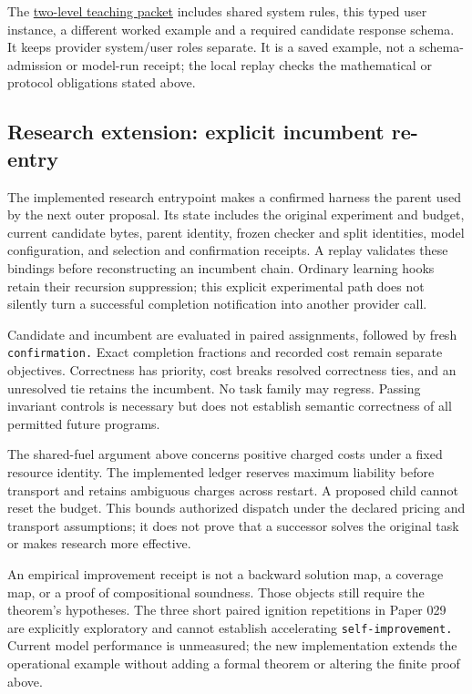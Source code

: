 \documentclass[
  11pt,
]{article}
\begin{document}
The \href{prompts/example.yaml}{two-level teaching packet} includes
shared system rules, this typed user instance, a different worked
example and a required candidate response schema. It keeps provider
system/user roles separate. It is a saved example, not a
schema-admission or model-run receipt; the local replay checks the
mathematical or protocol obligations stated above.

\subsection{Research extension: explicit incumbent
re-entry}\label{research-extension-explicit-incumbent-re-entry}

The implemented research entrypoint makes a confirmed harness the parent
used by the next outer proposal. Its state includes the original
experiment and budget, current candidate bytes, parent identity, frozen
checker and split identities, model configuration, and selection and
confirmation receipts. A replay validates these bindings before
reconstructing an incumbent chain. Ordinary learning hooks retain their
recursion suppression; this explicit experimental path does not silently
turn a successful completion notification into another provider call.

Candidate and incumbent are evaluated in paired assignments, followed by
fresh \nolinkurl{confirmation.} Exact completion fractions and recorded
cost remain separate objectives. Correctness has priority, cost breaks
resolved correctness ties, and an unresolved tie retains the incumbent.
No task family may regress. Passing invariant controls is necessary but
does not establish semantic correctness of all permitted future
programs.

The shared-fuel argument above concerns positive charged costs under a
fixed resource identity. The implemented ledger reserves maximum
liability before transport and retains ambiguous charges across restart.
A proposed child cannot reset the budget. This bounds authorized
dispatch under the declared pricing and transport assumptions; it does
not prove that a successor solves the original task or makes research
more effective.

An empirical improvement receipt is not a backward solution map, a
coverage map, or a proof of compositional soundness. Those objects still
require the theorem's hypotheses. The three short paired ignition
repetitions in Paper 029 are explicitly exploratory and cannot establish
accelerating \nolinkurl{self-improvement.} Current model performance is
unmeasured; the new implementation extends the operational example
without adding a formal theorem or altering the finite proof above.
\end{document}
